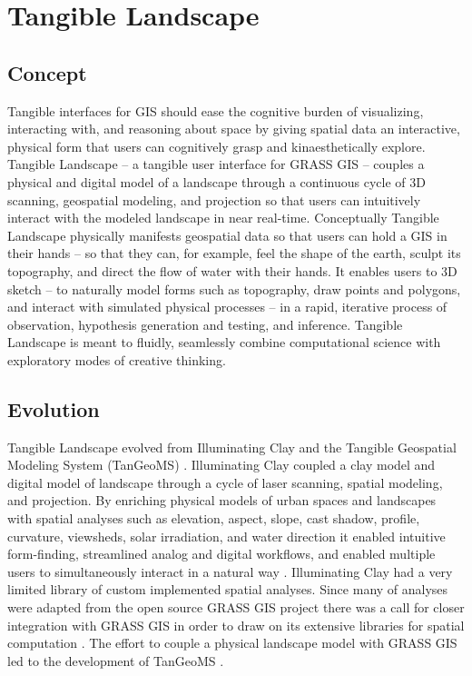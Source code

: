 \documentclass[prodmode,acmtochi]{acmsmall} %
\begin{document}
\section{Tangible Landscape}

\subsection{Concept}
%
Tangible interfaces for GIS 
should ease the cognitive burden of 
visualizing, interacting with, 
and reasoning about space
by giving spatial data an interactive, physical form 
that users can cognitively grasp and kinaesthetically explore. 
%
Tangible Landscape -- a tangible user interface for GRASS GIS --
couples a physical and digital model of a landscape through a continuous cycle of 3D scanning, geospatial modeling, and projection
so that users can intuitively interact with the modeled landscape in near real-time.
%
Conceptually Tangible Landscape physically manifests geospatial data 
so that users can hold a GIS in their hands -- 
so that they can, for example, feel the shape of the earth, sculpt its topography, and direct the flow of water with their hands.
%
It enables users to 3D sketch -- 
to naturally model forms such as topography, 
draw points and polygons, 
and interact with simulated physical processes -- 
in a rapid, iterative process 
of observation, hypothesis generation and testing, and inference. 
%
Tangible Landscape is meant to fluidly, seamlessly combine
computational science with exploratory modes of creative thinking.

\subsection{Evolution}
%
Tangible Landscape evolved from 
Illuminating Clay \cite{Piper2002a} and 
the Tangible Geospatial Modeling System (TanGeoMS) \cite{Tateosian2010}. 
%
Illuminating Clay coupled a clay model and digital model of landscape 
through a cycle of laser scanning, spatial modeling, and projection.
%
By enriching physical models of urban spaces and landscapes 
with spatial analyses  
such as 
elevation, aspect, slope, cast shadow, profile, curvature, 
viewsheds, solar irradiation, and water direction
it enabled
intuitive form-finding, 
streamlined analog and digital workflows, 
and enabled multiple users to simultaneously interact in a natural way \cite{Ratti2004}. 
%
Illuminating Clay had a very limited library of custom implemented spatial analyses. 
%
Since many of analyses were adapted 
from the open source GRASS GIS project \cite{Piper2002a} 
there was a call for closer integration with GRASS GIS 
in order to draw on its extensive libraries 
for spatial computation \cite{Piper2002b}. 
%
The effort to couple a physical landscape model with GRASS GIS \cite{Mitasova2006} 
led to the development of 
TanGeoMS \cite{Tateosian2010}.
\end{document}

